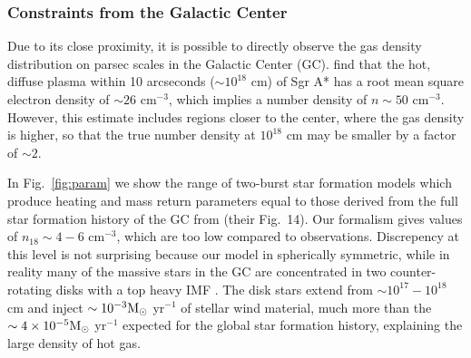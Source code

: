 \documentclass[usenatbib,fleqn]{mnras}
\newcommand{\Msun}{{\rm M_\odot}}
\begin{document}

\subsubsection{Constraints from the Galactic Center}
\label{sec:empirical}

Due to its close proximity, it is possible to directly observe the gas
density distribution on parsec scales in the Galactic Center
(GC). \citet{Baganoff+2003} find that the hot, diffuse plasma within
10 arcseconds ($\sim 10^{18}$ cm) of Sgr A* has a root mean square
electron density of $\sim 26$ cm$^{-3}$, which implies a number
density of $n\sim 50$ cm$^{-3}$. However, this estimate includes
regions closer to the center, where the gas density is higher, so that
the true number density at $10^{18}$ cm may be smaller by a factor of
$\sim 2$.

In Fig.~\ref{fig:param} we show the range of two-burst star formation
models which produce heating and mass return parameters equal to those
derived from the full star formation history of the GC from
\citet{Pfuhl+2011} (their Fig.~14).  Our formalism gives values of
$n_{18}\sim 4-6$ cm$^{-3}$, which are too low compared to
observations.  Discrepency at this level is not surprising because our
model in spherically symmetric, while in reality many of the massive
stars in the GC are concentrated in two counter-rotating disks
\citep{Genzel+2003} with a top heavy IMF \citep{Bartko+2010}.  The
disk stars extend from $\sim 10^{17}-10^{18}$ cm and inject $\sim
10^{-3} \Msun$ yr$^{-1}$ of stellar wind material, much more than the
$\sim 4 \times 10^{-5} \Msun$ yr$^{-1}$ expected for the global star
formation history, explaining the large density of hot gas.
\end{document}
